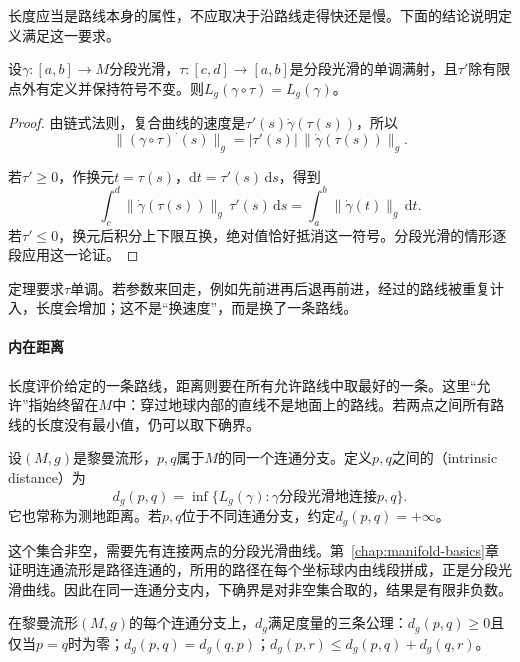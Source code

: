 长度应当是路线本身的属性，不应取决于沿路线走得快还是慢。下面的结论说明定义满足这一要求。

\begin{theorem}[长度与参数化无关]
\label{thm:riem-length-reparametrization}
设$\gamma:[a,b]\to M$分段光滑，$\tau:[c,d]\to[a,b]$是分段光滑的单调满射，且$\tau'$除有限点外有定义并保持符号不变。则$L_g(\gamma\circ\tau)=L_g(\gamma)$。
\end{theorem}

\begin{proof}
由链式法则，复合曲线的速度是$\tau'(s)\dot\gamma(\tau(s))$，所以
\[
\lVert(\gamma\circ\tau)^{\cdot}(s)\rVert_g=\lvert\tau'(s)\rvert\,\lVert\dot\gamma(\tau(s))\rVert_g .
\]

若$\tau'\geq0$，作换元$t=\tau(s)$，$\mathrm dt=\tau'(s)\,\mathrm ds$，得到
\[
\int_c^d\lVert\dot\gamma(\tau(s))\rVert_g\,\tau'(s)\,\mathrm ds=\int_a^b\lVert\dot\gamma(t)\rVert_g\,\mathrm dt .
\]
若$\tau'\leq0$，换元后积分上下限互换，绝对值恰好抵消这一符号。分段光滑的情形逐段应用这一论证。
\end{proof}

定理要求$\tau$单调。若参数来回走，例如先前进再后退再前进，经过的路线被重复计入，长度会增加；这不是“换速度”，而是换了一条路线。

\paragraph{内在距离}
长度评价给定的一条路线，距离则要在所有允许路线中取最好的一条。这里“允许”指始终留在$M$中：穿过地球内部的直线不是地面上的路线。若两点之间所有路线的长度没有最小值，仍可以取下确界。

\begin{definition}[内在距离]
\label{def:riem-intrinsic-distance}
设$(M,g)$是黎曼流形，$p,q$属于$M$的同一个连通分支。定义$p,q$之间的（intrinsic distance）为
\begin{equation}
d_g(p,q)=\inf\bigl\{L_g(\gamma):\gamma\text{分段光滑地连接}p,q\bigr\}.
\label{eq:riem-intrinsic-distance}
\end{equation}
它也常称为测地距离。若$p,q$位于不同连通分支，约定$d_g(p,q)=+\infty$。
\end{definition}

这个集合非空，需要先有连接两点的分段光滑曲线。第~\ref{chap:manifold-basics}章证明连通流形是路径连通的，所用的路径在每个坐标球内由线段拼成，正是分段光滑曲线。因此在同一连通分支内，下确界是对非空集合取的，结果是有限非负数。

\begin{theorem}[内在距离是度量]
\label{thm:riem-distance-metric}
在黎曼流形$(M,g)$的每个连通分支上，$d_g$满足度量的三条公理：$d_g(p,q)\geq0$且仅当$p=q$时为零；$d_g(p,q)=d_g(q,p)$；$d_g(p,r)\leq d_g(p,q)+d_g(q,r)$。
\end{theorem}

